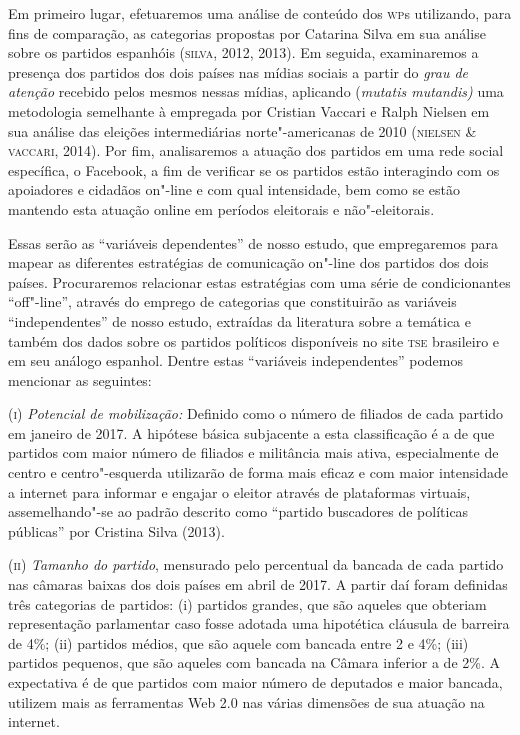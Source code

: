 Em primeiro lugar, efetuaremos uma análise de conteúdo dos \textsc{wp}s
utilizando, para fins de comparação, as categorias propostas por
Catarina Silva em sua análise sobre os partidos espanhóis (\textsc{silva}, 2012,
2013). Em seguida, examinaremos a presença dos partidos dos dois países
nas mídias sociais a partir do \emph{grau de atenção} recebido pelos
mesmos nessas mídias, aplicando (\emph{mutatis mutandis)} uma
metodologia semelhante à empregada por Cristian Vaccari e Ralph Nielsen
em sua análise das eleições intermediárias norte"-americanas de 2010
(\textsc{nielsen} \& \textsc{vaccari}, 2014). Por fim, analisaremos a atuação dos partidos
em uma rede social específica, o Facebook, a fim de verificar se os
partidos estão interagindo com os apoiadores e cidadãos on"-line e com
qual intensidade, bem como se estão mantendo esta atuação online em
períodos eleitorais e não"-eleitorais.

Essas serão as ``variáveis dependentes'' de nosso estudo, que
empregaremos para mapear as diferentes estratégias de comunicação
on"-line dos partidos dos dois países. Procuraremos relacionar estas
estratégias com uma série de condicionantes ``off"-line'', através do
emprego de categorias que constituirão as variáveis ``independentes'' de
nosso estudo, extraídas da literatura sobre a temática e também dos
dados sobre os partidos políticos disponíveis no site \textsc{tse} brasileiro e
em seu análogo espanhol. Dentre estas ``variáveis independentes''
podemos mencionar as seguintes:

(\textsc{i}) \emph{Potencial de mobilização:} Definido como o número de
filiados de cada partido em janeiro de 2017. A hipótese básica
subjacente a esta classificação é a de que partidos com maior número de
filiados e militância mais ativa, especialmente de centro e
centro"-esquerda utilizarão de forma mais eficaz e com maior intensidade
a internet para informar e engajar o eleitor através de plataformas
virtuais, assemelhando"-se ao padrão descrito como ``partido buscadores
de políticas públicas'' por Cristina Silva (2013).

(\textsc{ii}) \emph{Tamanho do partido}, mensurado pelo percentual da
bancada de cada partido nas câmaras baixas dos dois países em abril de
2017. A partir daí foram definidas três categorias de partidos: (i)
partidos grandes, que são aqueles que obteriam representação parlamentar
caso fosse adotada uma hipotética cláusula de barreira de 4\%; (ii)
partidos médios, que são aquele com bancada entre 2 e 4\%; (iii)
partidos pequenos, que são aqueles com bancada na Câmara inferior a de
2\%. A expectativa é de que partidos com maior número de deputados e
maior bancada, utilizem mais as ferramentas Web 2.0 nas várias dimensões
de sua atuação na internet.

